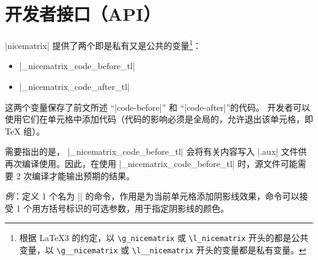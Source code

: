 \documentclass[dvipsnames]{article}%
\begin{document}
\section{开发者接口（API）}

|nicematrix| 提供了两个即是私有又是公共的变量\footnote{根据 LaTeX3 的约定，以 \texttt{\textbackslash g\_nicematrix} 或 \texttt{\textbackslash l\_nicematrix} 开头的都是公共变量，以 \texttt{\textbackslash g\_\_nicematrix} 或 \texttt{\textbackslash l\_\_nicematrix} 开头的变量都是私有变量。}：
\begin{itemize}
\item |\g_nicematrix_code_before_tl|
\item |\g_nicematrix_code_after_tl|
\end{itemize}


\medskip
这两个变量保存了前文所述 “|code-before|” 和 “|code-after|”的代码。
开发者可以使用它们在单元格中添加代码（代码的影响必须是全局的，允许退出该单元格，即 TeX 组）。

\medskip
需要指出的是， |\g_nicematrix_code_before_tl| 会将有关内容写入 |.aux| 文件供再次编译使用。因此，在使用 |\g_nicematrix_code_before_tl| 时，源文件可能需要 2 次编译才能输出预期的结果。

\bigskip
\emph{例}：定义 1 个名为 |\hatchcell| 的命令，作用是为当前单元格添加阴影线效果，命令可以接受 1 个用方括号标识的可选参数，用于指定阴影线的颜色。
\end{document}
